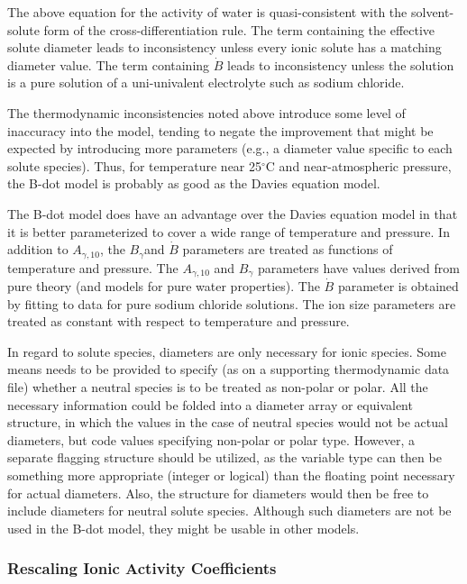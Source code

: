 The above equation for the activity of water is quasi-consistent with
the solvent-solute form of the cross-differentiation rule. The term
containing the effective solute diameter leads to inconsistency unless
every ionic solute has a matching diameter value. The term containing
$\dot{B}$ leads to inconsistency unless the solution is a pure
solution of a uni-univalent electrolyte such as sodium chloride.

The thermodynamic inconsistencies noted above introduce some level of
inaccuracy into the model, tending to negate the improvement that
might be expected by introducing more parameters (e.g., a diameter
value specific to each solute species). Thus, for temperature near
25${}^\circ$C and near-atmospheric pressure, the B-dot model is
probably as good as the Davies equation model.

The B-dot model does have an advantage over the Davies equation model
in that it is better parameterized to cover a wide range of
temperature and pressure. In addition to $A_{\gamma ,10}$, the
$B_{\gamma} $and $\dot{B}$ parameters are treated as functions of
temperature and pressure. The $A_{\gamma ,10} $ and $B_{\gamma}$ 
parameters have values derived from pure theory (and models for pure
water properties). The $\dot{B}$ parameter is obtained by fitting to
data for pure sodium chloride solutions. The ion size parameters are
treated as constant with respect to temperature and pressure.

In regard to solute species, diameters are only necessary for ionic
species. Some means needs to be provided to specify (as on a
supporting thermodynamic data file) whether a neutral species is to be
treated as non-polar or polar. All the necessary information could be
folded into a diameter array or equivalent structure, in which the
values in the case of neutral species would not be actual diameters,
but code values specifying non-polar or polar type. However, a
separate flagging structure should be utilized, as the variable type
can then be something more appropriate (integer or logical) than the
floating point necessary for actual diameters. Also, the structure for
diameters would then be free to include diameters for neutral solute
species. Although such diameters are not be used in the B-dot model,
they might be usable in other models.







\subsubsection{Rescaling Ionic Activity Coefficients}

